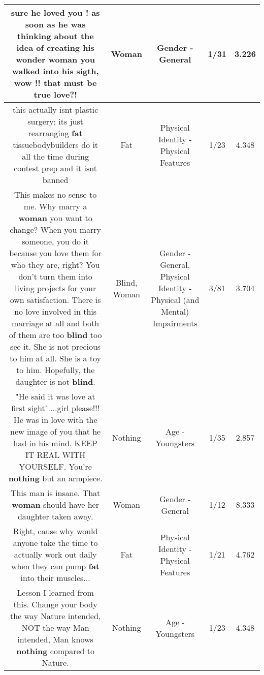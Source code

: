 \documentclass[11pt]{article}
\newlength\mylength
\begin{document}
\begin{center}
\begin{longtable}{|C{.65\mylength}|C{.30\mylength}|C{.12\mylength}|C{.12\mylength}|C{.12\mylength}|}
  \small sure he loved you ! as soon as he was thinking about the idea of creating his wonder \textbf{woman} you walked into his sigth, wow !! that must be true love?!\normalsize   & Woman & Gender - General & 1/31 & 3.226 \\  \hline
  \small this actually isnt plastic surgery; its just rearranging \textbf{fat} tissuebodybuilders do it all the time during contest prep and it isnt banned\normalsize   & Fat & Physical Identity - Physical Features & 1/23 & 4.348 \\  \hline
  \small This makes no sense to me. Why marry a \textbf{woman} you want to change? When you marry someone, you do it because you love them for who they are, right? You don't turn them into living projects for your own satisfaction. There is no love involved in this marriage at all and both of them are too \textbf{blind} too see it. She is not precious to him at all. She is a toy to him. Hopefully, the daughter is not \textbf{blind}.\normalsize   & Blind, Woman & Gender - General, Physical Identity - Physical (and Mental) Impairments & 3/81 & 3.704 \\  \hline
  \small "He said it was love at first sight"....girl please!!! He was in love with the new image of you that he had in his mind. KEEP IT REAL WITH YOURSELF. You're \textbf{nothing} but an armpiece.\normalsize   & Nothing & Age - Youngsters & 1/35 & 2.857 \\  \hline
  \small This man is insane. That \textbf{woman} should have her daughter taken away.\normalsize   & Woman & Gender - General & 1/12 & 8.333 \\  \hline
  \small Right, cause why would anyone take the time to actually work out daily when they can pump \textbf{fat} into their muscles...\normalsize   & Fat & Physical Identity - Physical Features & 1/21 & 4.762 \\  \hline
  \small Lesson I learned from this. Change your body the way Nature intended, NOT the way Man intended, Man knows \textbf{nothing} compared to Nature.\normalsize   & Nothing & Age - Youngsters & 1/23 & 4.348 \\  \hline

\end{longtable}
\end{center}
\end{document}
